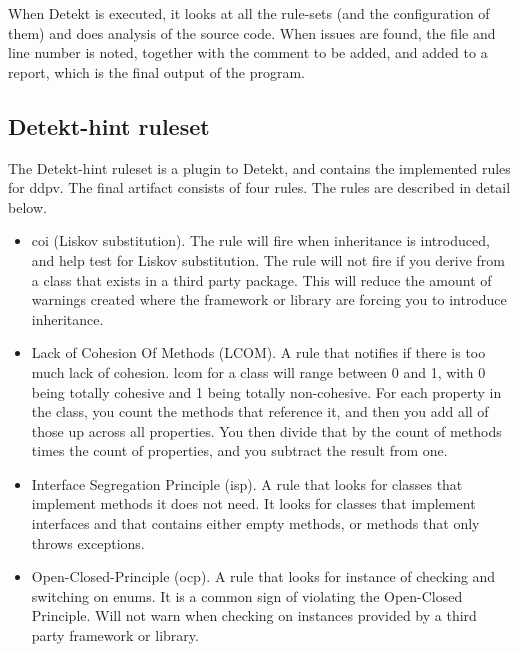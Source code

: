 \documentclass{report}
\begin{document}
When Detekt is executed, it looks at all the rule-sets (and the configuration of them) and does analysis of the source code. When issues are found, the file and line number is noted, together with the comment to be added, and added to a report, which is the final output of the program. 

\subsection{Detekt-hint ruleset}
The Detekt-hint ruleset is a plugin to Detekt, and contains the implemented rules for \gls{ddpv}. The final artifact consists of four rules. The rules are described in detail below.

\begin{itemize}
    \item\gls{coi} (Liskov substitution). The rule will fire when inheritance is introduced, and help test for Liskov substitution. The rule will not fire if you derive from a class that exists in a third party package. This will reduce the amount of warnings created where the framework or library are forcing you to introduce inheritance.         
    \item Lack of Cohesion Of Methods (LCOM). A rule that notifies if there is too much lack of cohesion. \gls{lcom} for a class will range between 0 and 1, with 0 being totally cohesive and 1 being totally non-cohesive. For each property in the class, you count the methods that reference it, and then you add all of those up across all properties. You then divide that by the count of methods times the count of properties, and you subtract the result from one\cite{}.
    \item Interface Segregation Principle (\gls{isp}). A rule that looks for classes that implement methods it does not need. It looks for classes that implement interfaces and that contains either empty methods, or methods that only throws exceptions.
    \item Open-Closed-Principle (\gls{ocp}). A rule that looks for instance of checking and switching on enums. It is a common sign of violating the Open-Closed Principle. Will not warn when checking on instances provided by a third party framework or library.
\end{itemize}

\end{document}
